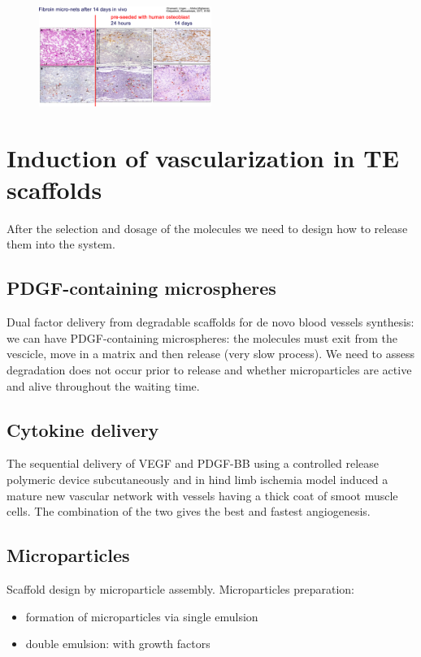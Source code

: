 \begin{figure}[h]
\centering
\includegraphics[width=0.5\textwidth]{fibroin}
\caption{\label{fig:fibroin}}
\end{figure}

\section{Induction of vascularization in TE scaffolds}
After the selection and dosage of the molecules we need to design how to release them into the system. 

\subsection{PDGF-containing microspheres}
Dual factor delivery from degradable scaffolds for de novo blood vessels synthesis: we can have PDGF-containing microspheres: the molecules must exit from the vescicle, move in a matrix and then release (very slow process). We need to assess degradation does not occur prior to release and whether microparticles are active and alive throughout the waiting time. 
\subsection{Cytokine delivery}
The sequential delivery of VEGF and PDGF-BB using a controlled release polymeric device subcutaneously and in hind limb ischemia model induced a mature new vascular network with vessels having a thick coat of smoot muscle cells. The combination of the two gives the best and fastest angiogenesis.
\subsection{Microparticles}
Scaffold design by microparticle assembly. Microparticles preparation:
\begin{itemize}
\item formation of microparticles via single emulsion
\item  double emulsion: with growth factors
\end{itemize}


